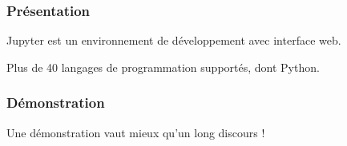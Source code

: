 \begin{frame}
  \frametitle{Présentation}
  Jupyter est un environnement de développement avec interface web.

  Plus de 40 langages de programmation supportés, dont Python.

\end{frame}

\begin{frame}
  \frametitle{Démonstration}
  Une démonstration vaut mieux qu'un long discours !

\end{frame}

